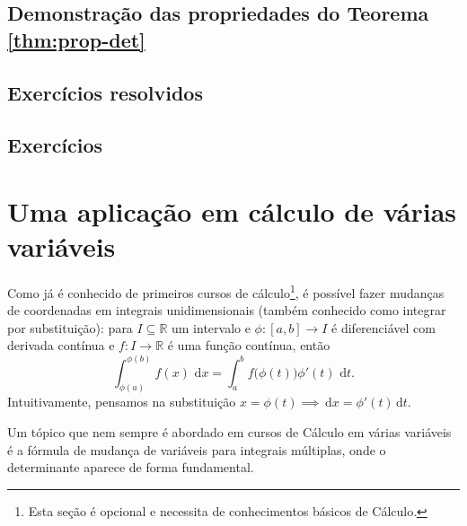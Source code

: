 \subsection{Demonstração das propriedades do Teorema \ref*{thm:prop-det}}

\emconstrucao

\subsection*{Exercícios resolvidos}

\construirExeresol

\subsection*{Exercícios}

\construirExer


\section{Uma aplicação em cálculo de várias variáveis}

Como já é conhecido de primeiros cursos de cálculo\footnote{Esta seção é opcional e necessita de conhecimentos básicos de Cálculo.}, é possível fazer mudanças de coordenadas em integrais unidimensionais (também conhecido como integrar por substituição): para $I \subseteq \mathbb{R}$ um intervalo e $\phi : [a,b] \to I$ é diferenciável com derivada contínua e $f: I \to \mathbb{R}$ é uma função contínua, então
\begin{equation}
\int_{\phi (a)}^{\phi (b)} f(x) \, \, \mathrm{d} x = \int_{a}^{b} f \big(\phi (t)\big) \phi'(t) \, \, \mathrm{d} t.
\end{equation} Intuitivamente, pensamos na substituição $x = \phi (t) \implies \, \mathrm{d} x = \phi' (t)\, \mathrm{d} t$.

Um tópico que nem sempre é abordado em cursos de Cálculo em várias variáveis é a fórmula de mudança de variáveis para integrais múltiplas, onde o determinante aparece de forma fundamental.

